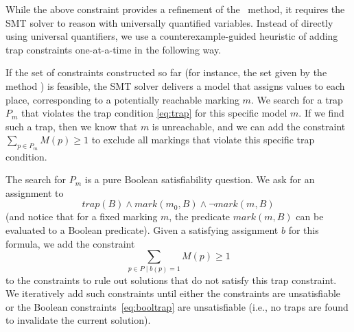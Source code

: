 While the above constraint provides a refinement of the \safety\ method, it requires the
SMT solver to reason with universally quantified variables.
Instead of directly using universal quantifiers, we use a counterexample-guided
heuristic \cite{EsparzaM00,CEGIS} of adding trap constraints one-at-a-time in
the following way.

If the set of constraints constructed so far (for instance, the set
given by the method \safety) is feasible, the SMT solver delivers a
model that assigns values to each place, corresponding to a potentially reachable marking $m$.  
We search for a trap $P_m$ that violates the trap condition \eqref{eq:trap} for this specific model $m$.
If we find such a trap, then we know that $m$ is unreachable, and we can
add the constraint $\sum_{p \in P_m} M(p) \geq 1$ to exclude all markings that violate
this specific trap condition.

The search for $P_m$ is a pure Boolean satisfiability question.
We ask for an assignment to 
\begin{equation}\label{eq:booltrap}
\mathit{trap}(B) \wedge \mathit{mark}(m_0,B) \wedge \lnot \mathit{mark}(m, B)
\end{equation}
(and notice that for a fixed marking $m$, the predicate $\mathit{mark}(m,B)$ can
be evaluated to a Boolean predicate).
Given a satisfying assignment $b$ for this formula, we add the constraint
\begin{equation}\label{eq:trapcons}
\sum_{p \in P \mid b(p) = 1} M(p) \geq 1
\end{equation} 
to the constraints to rule out solutions that
do not satisfy this trap constraint.
We iteratively add such constraints until either the constraints are unsatisfiable
or the Boolean constraints~\eqref{eq:booltrap} are unsatisfiable (i.e., no traps are found
to invalidate the current solution). 
% 
% 
 
